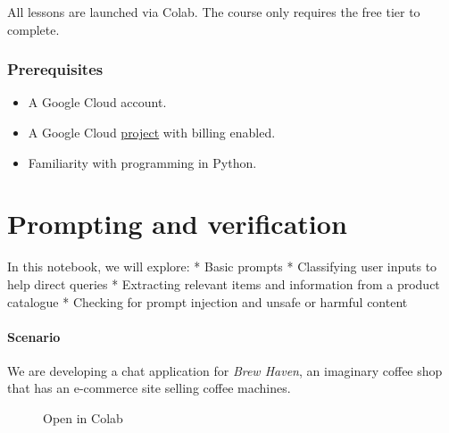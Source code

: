 \documentclass[
  letterpaper,
  DIV=11,
  numbers=noendperiod]{scrreprt}
\providecommand{\tightlist}{%
  \setlength{\itemsep}{0pt}\setlength{\parskip}{0pt}}\usepackage{longtable,booktabs,array}
\begin{document}
All lessons are launched via Colab. The course only requires the free
tier to complete.

\hypertarget{prerequisites}{%
\subsection*{Prerequisites}\label{prerequisites}}

\begin{itemize}
\tightlist
\item
  A Google Cloud account.
\item
  A Google Cloud
  \href{https://cloud.google.com/resource-manager/docs/creating-managing-projects}{project}
  with billing enabled.
\item
  Familiarity with programming in Python.
\end{itemize}


\hypertarget{prompting-and-verification}{%
\chapter{Prompting and verification}\label{prompting-and-verification}}

In this notebook, we will explore: * Basic prompts * Classifying user
inputs to help direct queries * Extracting relevant items and
information from a product catalogue * Checking for prompt injection and
unsafe or harmful content

\hypertarget{scenario}{%
\subsubsection{Scenario}\label{scenario}}

We are developing a chat application for \emph{Brew Haven}, an imaginary
coffee shop that has an e-commerce site selling coffee machines.

\begin{figure}

{\centering 

\href{https://colab.research.google.com/github/rastringer/building_apps_with_genai_studio/blob/main/1_prompting_and_verification.ipynb}{}

}

\caption{Open in Colab}

\end{figure}
\end{document}
